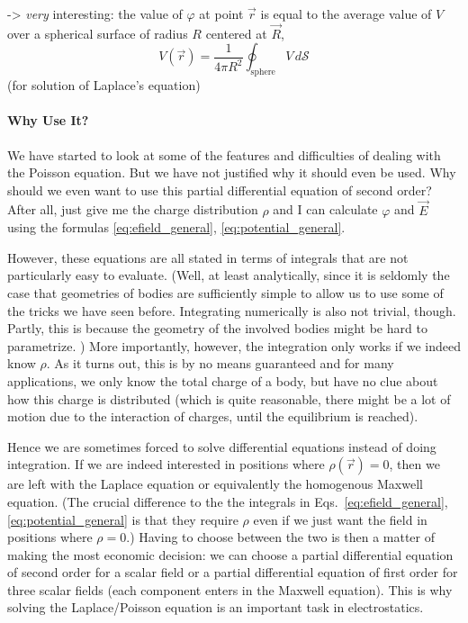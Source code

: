 \documentclass[../class_mech_main.tex]{subfiles}
\begin{document}
-> \emph{very} interesting: the value of $\varphi$ at point $\vec{r}$ is equal to the average value of $V$ over a spherical surface of radius $R$ centered at $\vec{R}$,
\begin{equation}
    V(\vec{r}) = \frac{1}{4\pi R^2} \oint_\mathrm{sphere} V \, d\mathcal{S}
\end{equation}
(for solution of Laplace's equation)



        \paragraph{Why Use It?}
We have started to look at some of the features and difficulties of dealing with the Poisson equation. But we have not justified why it should even be used. Why should we even want to use this partial differential equation of second order? After all, just give me the charge distribution $\rho$ and I can calculate $\varphi$ and $\vec{E}$ using the formulas \eqref{eq:efield_general}, \eqref{eq:potential_general}.

However, these equations are all stated in terms of integrals that are not particularly easy to evaluate. (Well, at least analytically, since it is seldomly the case that geometries of bodies are sufficiently simple to allow us to use some of the tricks we have seen before. Integrating numerically is also not trivial, though. Partly, this is because the geometry of the involved bodies might be hard to parametrize. ) More importantly, however, the integration only works if we indeed know $\rho$. As it turns out, this is by no means guaranteed and for many applications, we only know the total charge of a body, but have no clue about how this charge is distributed (which is quite reasonable, there might be a lot of motion due to the interaction of charges, until the equilibrium is reached).

Hence we are sometimes forced to solve differential equations instead of doing integration. If we are indeed interested in positions where $\rho(\vec{r}) = 0$, then we are left with the Laplace equation or equivalently the homogenous Maxwell equation. (The crucial difference to the the integrals in Eqs.~\eqref{eq:efield_general}, \eqref{eq:potential_general} is that they require $\rho$ even if we just want the field in positions where $\rho = 0$.) Having to choose between the two is then a matter of making the most economic decision: we can choose a partial differential equation of second order for a scalar field or a partial differential equation of first order for three scalar fields (each component enters in the Maxwell equation). This is why solving the Laplace/Poisson equation is an important task in electrostatics.
\end{document}
